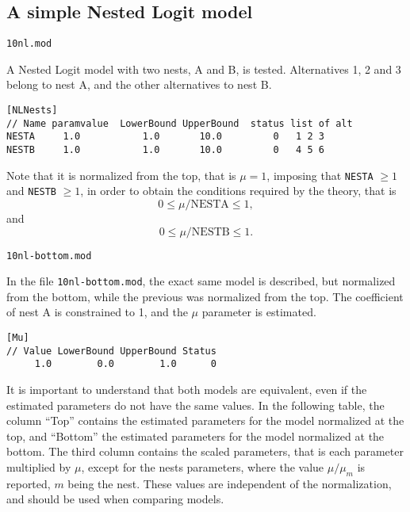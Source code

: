 \documentclass[12pt]{memoir}
\begin{document}
\subsection{A simple Nested Logit model}
\begin{flushright}
\verb+10nl.mod+
\end{flushright}
A Nested Logit model with two nests, A and B, is tested. Alternatives 1, 2 and 3 
belong to nest A, and the other alternatives to nest B.
\small
{\footnotesize
\begin{verbatim}
[NLNests]
// Name paramvalue  LowerBound UpperBound  status list of alt
NESTA     1.0           1.0       10.0         0   1 2 3 
NESTB     1.0           1.0       10.0         0   4 5 6
\end{verbatim}
}
\normalsize

Note that it is normalized from the top, that is $\mu=1$, imposing that \verb+NESTA+ $\geq 1$ and \verb+NESTB+ $\geq 1$, in order to obtain the conditions required by the theory, that is
\[
0 \leq \mu/\text{NESTA} \leq 1,
\]
and
\[
0 \leq \mu/\text{NESTB} \leq 1.
\]


\begin{flushright}
\verb+10nl-bottom.mod+
\end{flushright}

In the file \verb+10nl-bottom.mod+, the exact same model is described, but
normalized from the bottom, while the previous was normalized from
the top.  The coefficient of nest A is constrained to 1, and the $\mu$
parameter is estimated. 
{\footnotesize
\begin{verbatim}
[Mu]
// Value LowerBound UpperBound Status
     1.0        0.0        1.0      0
\end{verbatim}
}

It is important to understand that both models are equivalent, even if
the estimated parameters do not have the same values. In the following
table, the column ``Top'' contains the estimated parameters for the
model normalized at the top, and ``Bottom'' the estimated parameters
for the model normalized at the bottom. The third column contains the
scaled parameters, that is each parameter multiplied by $\mu$, except
for the nests parameters, where the value $\mu/\mu_m$ is reported, $m$
being the nest. These values are independent of the normalization, and
should be used when comparing models.
\end{document}
